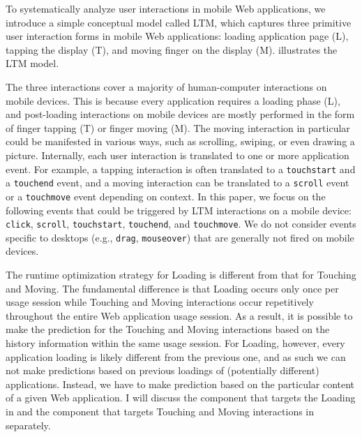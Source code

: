 To systematically analyze user interactions in mobile Web applications, we introduce a simple conceptual model called LTM, which captures three primitive user interaction forms in mobile Web applications: loading application page (L), tapping the display (T), and moving finger on the display (M).  illustrates the LTM model.

The three interactions cover a majority of human-computer interactions on mobile devices. This is because every application requires a loading phase (L), and post-loading interactions on mobile devices are mostly performed in the form of finger tapping (T) or finger moving (M). The moving interaction in particular could be manifested in various ways, such as scrolling, swiping, or even drawing a picture. Internally, each user interaction is translated to one or more application event. For example, a tapping interaction is often translated to a \texttt{touchstart} and a \texttt{touchend} event, and a moving interaction can be translated to a \texttt{scroll} event or a \texttt{touchmove} event depending on context. In this paper, we focus on the following events that could be triggered by LTM interactions on a mobile device: \texttt{click}, \texttt{scroll}, \texttt{touchstart}, \texttt{touchend}, and \texttt{touchmove}. We do not consider events specific to desktops (e.g., \texttt{drag}, \texttt{mouseover}) that are generally not fired on mobile devices.


The runtime optimization strategy for Loading is different from that for Touching and Moving. The fundamental difference is that Loading occurs only once per usage session while Touching and Moving interactions occur repetitively throughout the entire Web application usage session. As a result, it is possible to make the prediction for the Touching and Moving interactions based on the history information within the same usage session. For Loading, however, every application loading is likely different from the previous one, and as such we can not make predictions based on previous loadings of (potentially different) applications. Instead, we have to make prediction based on the particular content of a given Web application. I will discuss the \webrt component that targets the Loading in  and the component that targets Touching and Moving interactions in  separately.

